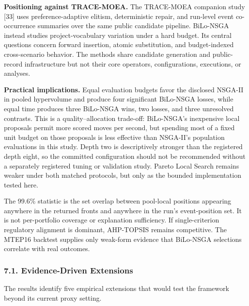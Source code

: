 \documentclass[
]{article}
\begin{document}
\textbf{Positioning against TRACE-MOEA.} The TRACE-MOEA companion study {[}33{]} uses preference-adaptive elitism, deterministic repair, and run-level event co-occurrence summaries over the same public candidate pipeline. BiLo-NSGA instead studies project-vocabulary variation under a hard budget. Its central questions concern forward insertion, atomic substitution, and budget-indexed cross-scenario behavior. The methods share candidate generation and public-record infrastructure but not their core operators, configurations, executions, or analyses.

\textbf{Practical implications.} Equal evaluation budgets favor the disclosed NSGA-II in pooled hypervolume and produce four significant BiLo-NSGA losses, while equal time produces three BiLo-NSGA wins, two losses, and three unresolved contrasts. This is a quality--allocation trade-off: BiLo-NSGA's inexpensive local proposals permit more scored moves per second, but spending most of a fixed unit budget on those proposals is less effective than NSGA-II's population evaluations in this study. Depth two is descriptively stronger than the registered depth eight, so the committed configuration should not be recommended without a separately registered tuning or validation study. Pareto Local Search remains weaker under both matched protocols, but only as the bounded implementation tested here.

The 99.6\% statistic is the set overlap between pool-local positions appearing anywhere in the returned fronts and anywhere in the run's event-position set. It is not per-portfolio coverage or explanation sufficiency. If single-criterion regulatory alignment is dominant, AHP-TOPSIS remains competitive. The MTEP16 backtest supplies only weak-form evidence that BiLo-NSGA selections correlate with real outcomes.

\subsubsection{7.1. Evidence-Driven Extensions}\label{evidence-driven-extensions}

The results identify five empirical extensions that would test the framework beyond its current proxy setting.
\end{document}
